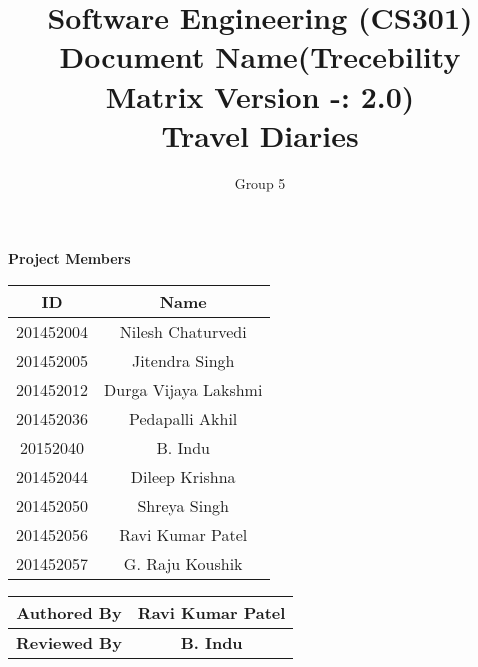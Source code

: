 \documentclass[]{article}
\title{Software Engineering (CS301)\\ Document Name(Trecebility Matrix Version -: 2.0)\\Travel Diaries}
\author{Group 5}
\begin{document}
\maketitle


\begin{center}
\textbf{Project Members}\\
\vspace*{.6cm}
\begin{tabular}{|c|c|}
\hline
\textbf{ID} & \textbf{Name}\\
\hline
\hline
201452004 & Nilesh Chaturvedi\\
\hline
201452005 & Jitendra Singh\\
\hline
201452012 & Durga Vijaya Lakshmi\\
\hline
201452036 & Pedapalli Akhil\\
\hline
20152040 & B. Indu\\
\hline
201452044 & Dileep Krishna\\
\hline
201452050 & Shreya Singh\\
\hline
201452056 & Ravi Kumar Patel\\
\hline
201452057 & G. Raju Koushik\\
\hline
\end{tabular}

\vspace*{1cm}

\begin{tabular}{|c|c|}
\hline
\textbf{Authored By} & \textbf{Ravi Kumar Patel}\\
\hline
\textbf{Reviewed By} & \textbf{B. Indu}\\
\hline
\end{tabular}
\end{center}

\newpage
\tableofcontents
\newpage
\end{document}
